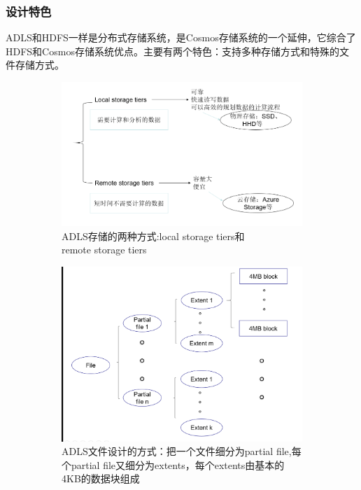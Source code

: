 \documentclass[11pt]{article}
\begin{document}
\subsubsection{设计特色}
ADLS和HDFS一样是分布式存储系统，是Cosmos存储系统的一个延伸，它综合了HDFS和Cosmos存储系统优点。主要有两个特色：支持多种存储方式和特殊的文件存储方式。
\begin{figure}[!htbp]
	\begin{subfigure}[b]{0.5\linewidth}
		\includegraphics[width=\linewidth]{figs/data_store.png}
		\caption{ADLS存储的两种方式:local storage tiers和\\remote storage tiers}
		\label{fig:data_store}
	\end{subfigure}
	\begin{subfigure}[b]{0.5\linewidth}
		\includegraphics[width=0.8\linewidth]{figs/file_store.png}
		\caption{ADLS文件设计的方式：把一个文件细分为partial file,每个partial file又细分为extents，每个extents由基本的4KB的数据块组成}
		\label{fig:file_store}
	\end{subfigure}
	\caption{}
\end{figure}
\end{document}
